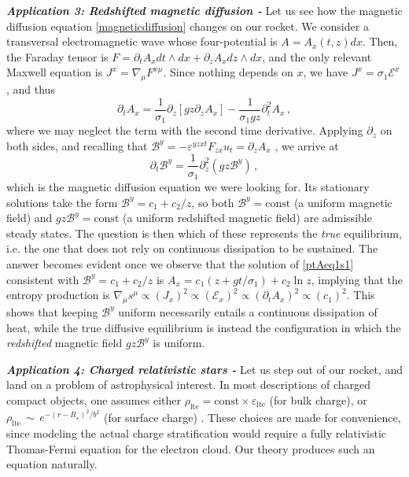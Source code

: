 \documentclass[a4paper, amsfonts, amssymb, amsmath, reprint, showkeys, nofootinbib, twoside,notitlepage]{revtex4-1}
\theoremstyle{definition}
\theoremstyle{theorem}
\begin{document}
\newpage
\noindent\textit{\bf Application 3: Redshifted magnetic diffusion -} Let us see how the magnetic diffusion equation \eqref{magneticdiffusion} changes on our rocket.
We consider a transversal electromagnetic wave whose four-potential is $A=A_x(t,z)dx$. Then, the Faraday tensor is $F=\partial_t A_x dt\wedge dx+\partial_z A_x dz \wedge dx$, and the only relevant Maxwell equation is $J^x=\nabla_\mu F^{x \mu}$. Since nothing depends on $x$, we have $J^x{=}\sigma_1\mathcal{E}^x$, and thus 
\begin{equation}\label{ptAeq1s1}
\partial_t A_x=\dfrac{1}{\sigma_1} \partial_z \left[ gz\partial_z A_x\right] -\dfrac{1}{\sigma_1 g z} \partial^2_t A_x \, ,
\end{equation}
where we may neglect the term with the second time derivative.
Applying $\partial_z$ on both sides, and recalling that $\mathcal{B}^y=-\varepsilon^{yzxt}F_{zx}u_t=\partial_z A_x$ \cite{special_in_gen}, we arrive at
\begin{equation}\label{grasch}
\partial_t \mathcal{B}^y=\dfrac{1}{\sigma_1} \partial_z^2 \left( gz\mathcal{B}^y\right) \, ,
\end{equation}
which is the magnetic diffusion equation we were looking for. Its stationary solutions take the form $\mathcal{B}^y= c_1+c_2/z $, so both $\mathcal{B}^y=\text{const}$ (a uniform magnetic field) and $gz\mathcal{B}^y=\text{const}$ (a uniform redshifted magnetic field) are admissible steady states. The question is then which of these represents the \textit{true} equilibrium, i.e. the one that does not rely on continuous dissipation to be sustained. The answer becomes evident once we observe that the solution of \eqref{ptAeq1s1} consistent with $\mathcal{B}^y= c_1+c_2/z $ is $A_x = c_1 \left(z+gt/{\sigma_1}\right) + c_2 \ln z $, implying that the entropy production is $\nabla_\mu s^\mu \propto (J_x)^2 \propto (\mathcal{E}_x)^2 \propto (\partial_t A_x)^2 \propto (c_1)^2$. This shows that keeping $\mathcal{B}^y$ uniform necessarily entails a continuous dissipation of heat, while the true diffusive equilibrium is instead the configuration in which the \textit{redshifted} magnetic field $gz\mathcal{B}^y$ is uniform.

\noindent\textit{\bf Application 4: Charged relativistic stars -} Let us step out of our rocket, and land on a problem of astrophysical interest. In most descriptions of charged compact objects, one assumes either $\rho_\text{lte}=\text{const} \times \varepsilon_\text{lte}$ (for bulk charge), or $\rho_\text{lte}\,{\sim}\, e^{-(r-R_\star)^2/b^2}$ (for surface charge) \cite{Ray:2003gt,Ray:2004yr,Negreiros:2009fd,Carvalho:2018kbt,FRocha2020,Arbanil2022}. These choices are made for convenience, since modeling the actual charge stratification would require a fully relativistic Thomas-Fermi equation for the electron cloud. Our theory produces such an equation naturally.
\end{document}
